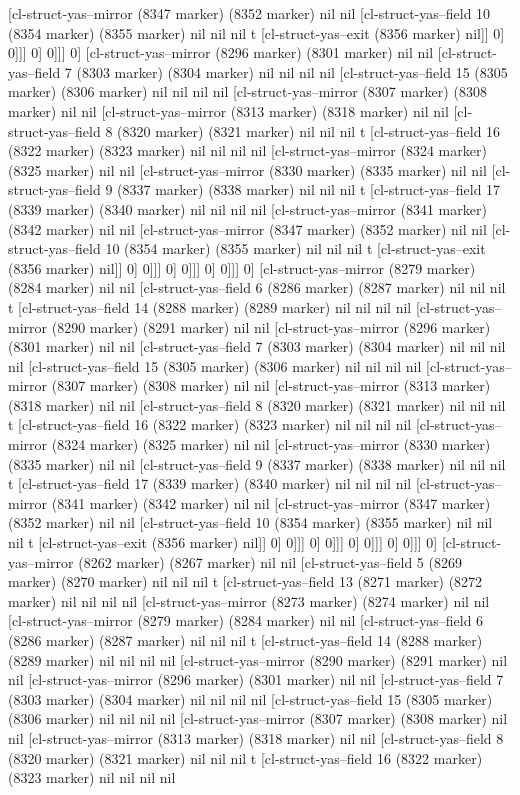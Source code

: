 {{[cl-struct-yas--mirror (8347 marker) (8352 marker) nil nil [cl-struct-yas--field 10 (8354 marker) (8355 marker) nil nil nil t [cl-struct-yas--exit (8356 marker) nil]] 0] 0]]] 0] 0]]] 0] [cl-struct-yas--mirror (8296 marker) (8301 marker) nil nil [cl-struct-yas--field 7 (8303 marker) (8304 marker) nil nil nil nil [cl-struct-yas--field 15 (8305 marker) (8306 marker) nil nil nil nil [cl-struct-yas--mirror (8307 marker) (8308 marker) nil nil [cl-struct-yas--mirror (8313 marker) (8318 marker) nil nil [cl-struct-yas--field 8 (8320 marker) (8321 marker) nil nil nil t [cl-struct-yas--field 16 (8322 marker) (8323 marker) nil nil nil nil [cl-struct-yas--mirror (8324 marker) (8325 marker) nil nil [cl-struct-yas--mirror (8330 marker) (8335 marker) nil nil [cl-struct-yas--field 9 (8337 marker) (8338 marker) nil nil nil t [cl-struct-yas--field 17 (8339 marker) (8340 marker) nil nil nil nil [cl-struct-yas--mirror (8341 marker) (8342 marker) nil nil [cl-struct-yas--mirror (8347 marker) (8352 marker) nil nil [cl-struct-yas--field 10 (8354 marker) (8355 marker) nil nil nil t [cl-struct-yas--exit (8356 marker) nil]] 0] 0]]] 0] 0]]] 0] 0]]] 0] [cl-struct-yas--mirror (8279 marker) (8284 marker) nil nil [cl-struct-yas--field 6 (8286 marker) (8287 marker) nil nil nil t [cl-struct-yas--field 14 (8288 marker) (8289 marker) nil nil nil nil [cl-struct-yas--mirror (8290 marker) (8291 marker) nil nil [cl-struct-yas--mirror (8296 marker) (8301 marker) nil nil [cl-struct-yas--field 7 (8303 marker) (8304 marker) nil nil nil nil [cl-struct-yas--field 15 (8305 marker) (8306 marker) nil nil nil nil [cl-struct-yas--mirror (8307 marker) (8308 marker) nil nil [cl-struct-yas--mirror (8313 marker) (8318 marker) nil nil [cl-struct-yas--field 8 (8320 marker) (8321 marker) nil nil nil t [cl-struct-yas--field 16 (8322 marker) (8323 marker) nil nil nil nil [cl-struct-yas--mirror (8324 marker) (8325 marker) nil nil [cl-struct-yas--mirror (8330 marker) (8335 marker) nil nil [cl-struct-yas--field 9 (8337 marker) (8338 marker) nil nil nil t [cl-struct-yas--field 17 (8339 marker) (8340 marker) nil nil nil nil [cl-struct-yas--mirror (8341 marker) (8342 marker) nil nil [cl-struct-yas--mirror (8347 marker) (8352 marker) nil nil [cl-struct-yas--field 10 (8354 marker) (8355 marker) nil nil nil t [cl-struct-yas--exit (8356 marker) nil]] 0] 0]]] 0] 0]]] 0] 0]]] 0] 0]]] 0] [cl-struct-yas--mirror (8262 marker) (8267 marker) nil nil [cl-struct-yas--field 5 (8269 marker) (8270 marker) nil nil nil t [cl-struct-yas--field 13 (8271 marker) (8272 marker) nil nil nil nil [cl-struct-yas--mirror (8273 marker) (8274 marker) nil nil [cl-struct-yas--mirror (8279 marker) (8284 marker) nil nil [cl-struct-yas--field 6 (8286 marker) (8287 marker) nil nil nil t [cl-struct-yas--field 14 (8288 marker) (8289 marker) nil nil nil nil [cl-struct-yas--mirror (8290 marker) (8291 marker) nil nil [cl-struct-yas--mirror (8296 marker) (8301 marker) nil nil [cl-struct-yas--field 7 (8303 marker) (8304 marker) nil nil nil nil [cl-struct-yas--field 15 (8305 marker) (8306 marker) nil nil nil nil [cl-struct-yas--mirror (8307 marker) (8308 marker) nil nil [cl-struct-yas--mirror (8313 marker) (8318 marker) nil nil [cl-struct-yas--field 8 (8320 marker) (8321 marker) nil nil nil t [cl-struct-yas--field 16 (8322 marker) (8323 marker) nil nil nil nil }}
